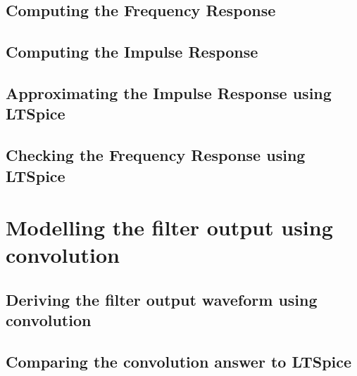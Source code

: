 \documentclass[11pt]{article}
\begin{document}
\subsection{Computing the Frequency Response}\label{subsec:computing_the_frequency_response}


\subsection{Computing the Impulse Response}\label{subsec:computing_the_impulse_response}


\subsection{Approximating the Impulse Response using LTSpice}\label{subsec:approximating_the_impulse_response_using_ltspice}


\subsection{Checking the Frequency Response using LTSpice}\label{subsec:checking_the_frequency_response_using_ltspice}



\section{Modelling the filter output using convolution}\label{sec:modelling_the_filter_output_using_convolution}

\subsection{Deriving the filter output waveform using convolution}\label{subsec:deriving_the_filter_output_waveform_using_convolution}


\subsection{Comparing the convolution answer to LTSpice}\label{subsec:comparing_the_convolution_answer_to_ltspice}

\end{document}
